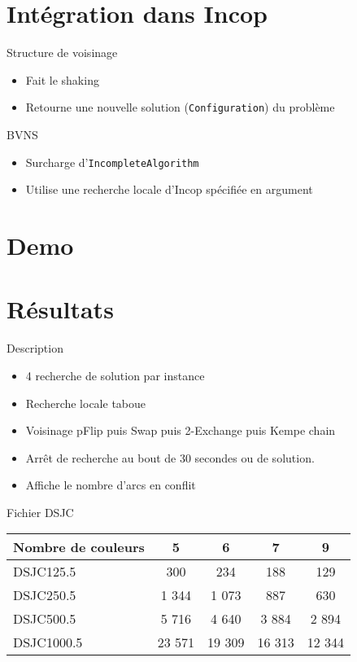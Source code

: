 \documentclass{beamer}
\begin{document}
	\section{Intégration dans Incop}
		\begin{frame}{Structure de voisinage}
			\begin{itemize}
				\item Fait le shaking
				\item Retourne une nouvelle solution (\texttt{Configuration}) du problème
			\end{itemize}
		\end{frame}
		
		\begin{frame}{BVNS}
			\begin{itemize}
				\item Surcharge d'\texttt{IncompleteAlgorithm}
				\item Utilise une recherche locale d'Incop spécifiée en argument
			\end{itemize}
		\end{frame}
		
	\section{Demo}
	
	\section{Résultats}
	
		\begin{frame}{Description}
			\begin{itemize}
				\item 4 recherche de solution par instance
				\item Recherche locale taboue
				\item Voisinage pFlip puis Swap puis 2-Exchange puis Kempe chain
				\item Arrêt de recherche au bout de 30 secondes ou de solution.
				\item Affiche le nombre d'arcs en conflit
			\end{itemize}
		\end{frame}
		
		\begin{frame}{Fichier DSJC}
	\begin{tabular}{|l|c|c|c|c|}
  	\hline
	Nombre de couleurs & 5 & 6 & 7 & 9 \\
  	\hline
	DSJC125.5 & 300 & 234 & 188 & 129 \\
	DSJC250.5 & 1 344 & 1 073 & 887 & 630 \\
	DSJC500.5 & 5 716 & 4 640 & 3 884 & 2 894 \\
	DSJC1000.5 & 23 571 & 19 309 & 16 313 & 12 344 \\
	\hline
	\end{tabular}
			
		\end{frame}
		
\end{document}
